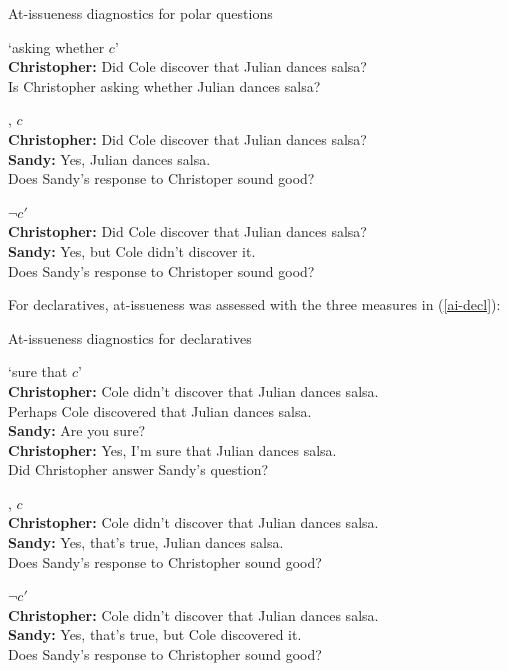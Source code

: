 \documentclass[11pt,fleqn]{article}
\newcommand{\6}{\mbox{$[\hspace*{-.6mm}[$}}
\newcommand{\9}{\mbox{$]\hspace*{-.6mm}]$}}
\begin{document}
\begin{exe}
\ex\label{ai-question} At-issueness diagnostics for polar questions
\begin{xlist}
\ex `asking whether $c$' 
\\ {\bf Christopher:} Did Cole discover that Julian dances salsa?
\\ Is Christopher asking whether Julian dances salsa?

, $c$
\\ {\bf Christopher:} Did Cole discover that Julian dances salsa?
\\ {\bf Sandy:} Yes, Julian dances salsa.
\\ Does Sandy's response to Christoper sound good?

 $\neg c'$
\\ {\bf Christopher:} Did Cole discover that Julian dances salsa?
\\ {\bf Sandy:} Yes, but Cole didn't discover it. 
\\ Does Sandy's response to Christoper sound good?

\end{xlist}
\end{exe}

For declaratives, at-issueness was assessed with the three measures in (\ref{ai-decl}):

\begin{exe}
\ex\label{ai-decl} At-issueness diagnostics for declaratives 

\begin{xlist}

\ex `sure that $c$'
\\ {\bf Christopher:} Cole didn't discover that Julian dances salsa.
\\ \hspace*{2cm} Perhaps Cole discovered that Julian dances salsa.
\\ {\bf Sandy:} Are you sure?
\\ {\bf Christopher:} Yes, I'm sure that Julian dances salsa.
\\ Did Christopher answer Sandy's question?

, $c$
\\ {\bf Christopher:} Cole didn't discover that Julian dances salsa.
\\ {\bf Sandy:} Yes, that's true, Julian dances salsa.
\\ Does Sandy's response to Christopher sound good?

 $\neg c'$
\\ {\bf Christopher:} Cole didn't discover that Julian dances salsa.
\\ {\bf Sandy:} Yes, that's true, but Cole discovered it. 
\\ Does Sandy's response to Christopher sound good?

\end{xlist}

\end{exe}
\end{document}
